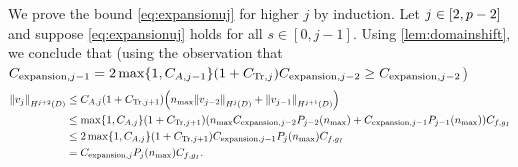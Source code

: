We prove the bound \cref{eq:expansionuj} for higher $j$ by induction. Let $j \in \mleft[2,p-2\mright]$ and suppose \cref{eq:expansionuj} holds for all $s \in [0,j-1].$ Using \cref{lem:domainshift}, we conclude that (using the observation that $\Cefn{j-1} = 2\max\set{1,\CAjmo}\mleft(1+\CTrj\mright)\Cefn{j-2}\geq \Cefn{j-2}$)
\begin{align*}
\NHfn{j+2}{D}{\vj} &\leq \CAj \mleft(1+\CTrjpo\mright)\mleft(\nmax \NHfn{j}{D}{\vfn{j-2}} + \NHfn{j+1}{D}{\vfn{j-1}}\mright)\\
&\leq \max\set{1,\CAj} \mleft(1+\CTrjpo\mright)\mleft(\nmax \Cefn{j-2} \Pfn{j-2}\mleft(\nmax\mright) + \Cefn{j-1} \Pfn{j-1}\mleft(\nmax\mright)\mright)\Cfg\\
&\leq 2\max\set{1,\CAj} \mleft(1+\CTrjpo\mright)\Cefn{j-1} \Pfn{j}(\nmax)\Cfg\\
&= \Cefn{j} \Pfn{j}(\nmax)\Cfg.
\end{align*}

